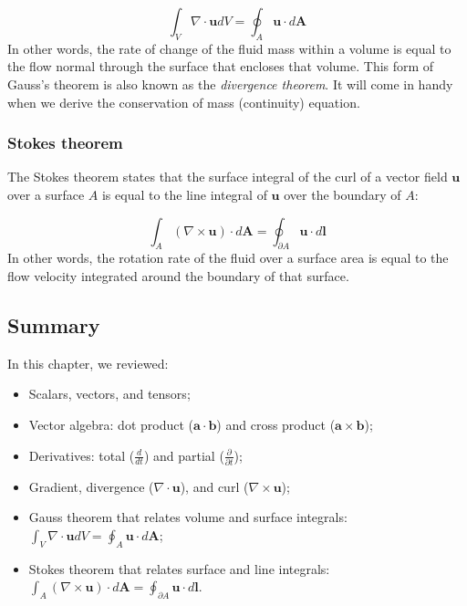 \documentclass[12pt]{article}
\numberwithin{equation}{section}
\numberwithin{figure}{section}
\numberwithin{table}{section}
\begin{document}
\begin{equation}
  \label{eq:divergence_theorem}
  \int_V \nabla \cdot \mathbf{u} dV = \oint_A \mathbf{u} \cdot d\mathbf{A}
\end{equation}
In other words, the rate of change of the fluid mass within a volume is equal to
the flow normal through the surface that encloses that volume.
This form of Gauss's theorem is also known as the
\textit{divergence theorem}.
It will come in handy when we derive the conservation of mass (continuity)
equation.

\subsubsection{Stokes theorem}

The Stokes theorem states that the surface integral of the curl of a
vector field $\mathbf{u}$ over a surface $A$ is equal to the line integral of
$\mathbf{u}$ over the boundary of $A$:

\begin{equation}
  \int_A (\nabla \times \mathbf{u}) \cdot d\mathbf{A} = \oint_{\partial A} \mathbf{u} \cdot d\mathbf{l}
\end{equation}
In other words, the rotation rate of the fluid over a surface area is equal to
the flow velocity integrated around the boundary of that surface.

\subsection*{Summary}

In this chapter, we reviewed:

\begin{itemize}
  \item Scalars, vectors, and tensors;
  \item Vector algebra: dot product ($\mathbf{a} \cdot \mathbf{b}$) and cross
  product ($\mathbf{a} \times \mathbf{b}$);
  \item Derivatives: total ($\frac{d}{dt}$) and partial ($\frac{\partial}{\partial t}$);
  \item Gradient, divergence ($\nabla \cdot \mathbf{u}$), and curl ($\nabla \times \mathbf{u}$);
  \item Gauss theorem that relates volume and surface integrals:
  $\int_V \nabla \cdot \mathbf{u} dV = \oint_A \mathbf{u} \cdot d\mathbf{A}$;
  \item Stokes theorem that relates surface and line integrals:
  $\int_A (\nabla \times \mathbf{u}) \cdot d\mathbf{A} = \oint_{\partial A} \mathbf{u} \cdot d\mathbf{l}$.
\end{itemize}
\end{document}
